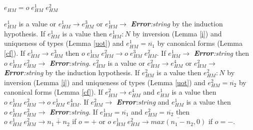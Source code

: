 \begin{case}
$e_{HM}=o\;e_{HM}^{1}\;e_{HM}^{2}$

$e_{HM}^{1}$ is a value or $e_{HM}^{1}\rightarrow e_{HM}^{3}$ or $e_{HM}^{1}\rightarrow$ \emph{\textbf{Error}:\;string} by the induction hypothesis.  If $e_{HM}^{1}$ is a value then $e_{HM}^{1}:N$ by inversion (Lemma \ref{i}) and uniqueness of types (Lemma \ref{uot}) and $e_{HM}^{1}=\overline{n_{1}}$ by canonical forms (Lemma \ref{cf}).  If $e_{HM}^{1}\rightarrow e_{HM}^{3}$ then $o\;e_{HM}^{1}\;e_{HM}^{2}\rightarrow o\;e_{HM}^{3}\;e_{HM}^{2}$.  If $e_{HM}^{1}\rightarrow$ \emph{\textbf{Error}:\;string} then $o\;e_{HM}^{1}\;e_{HM}^{2}\rightarrow$ \emph{\textbf{Error}:\;string}.  $e_{HM}^{2}$ is a value or $e_{HM}^{2}\rightarrow e_{HM}^{4}$ or $e_{HM}^{2}\rightarrow$ \emph{\textbf{Error}:\;string} by the induction hypothesis.  If $e_{HM}^{2}$ is a value then $e_{HM}^{2}:N$ by inversion (Lemma \ref{i}) and uniqueness of types (Lemma \ref{uot}) and $e_{HM}^{2}=\overline{n_{2}}$ by canonical forms (Lemma \ref{cf}).  If $e_{HM}^{2}\rightarrow e_{HM}^{4}$ and $e_{HM}^{1}$ is a value then $o\;e_{HM}^{1}\;e_{HM}^{2}\rightarrow o\;e_{HM}^{1}\;e_{HM}^{4}$.  If $e_{HM}^{2}\rightarrow$ \emph{\textbf{Error}:\;string} and $e_{HM}^{1}$ is a value then $o\;e_{HM}^{1}\;e_{HM}^{2}\rightarrow$ \emph{\textbf{Error}:\;string}.  If $e_{HM}^{1}=\overline{n_{1}}$ and $e_{HM}^{2}=\overline{n_{2}}$ then $o\;e_{HM}^{1}\;e_{HM}^{2}\rightarrow\overline{n_{1}+n_{2}}$ if $o=+$ or $o\;e_{HM}^{1}\;e_{HM}^{2}\rightarrow\overline{max(n_{1}-n_{2},0)}$ if $o=-$.
\end{case}